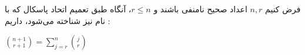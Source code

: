
\begin{fact}
  فرض کنیم
  $n,r$
  اعداد صحیح نامنفی باشند و
  $r \leq n$،
  آنگاه طبق تعمیم اتحاد پاسکال که با نام
  نیز شناخته می‌شود، داریم :
  \begin{center}
    $\binom{n+1}{r+1} = \sum\limits_{j=r}^n \binom{j}{r}$
  \end{center}
\end{fact}

